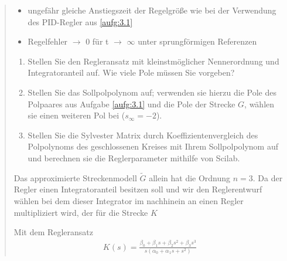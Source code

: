 \begin{quote}
\begin{itemize}
            \item ungefähr gleiche Anstiegszeit der Regelgröße wie bei der Verwendung des PID-Regler aus
            \ref{aufg:3.1}
            
            \item Regelfehler $\to$ 0 für t $\to$ $\infty$ unter sprungförmigen Referenzen
        
        \end{itemize}
        \vspace{1em}
        
        \begin{enumerate}
            
            \item Stellen Sie den Regleransatz mit kleinstmöglicher Nennerordnung und Integratoranteil auf. Wie viele Pole
            müssen Sie vorgeben?\\
            
            \item Stellen Sie das Sollpolpolynom auf; verwenden sie hierzu die Pole des Polpaares aus Aufgabe \ref{aufg:3.1}
            und die Pole der Strecke $G$, wählen sie einen weiteren Pol bei ($s_\infty = -2$).\\
            
            \item Stellen Sie die Sylvester Matrix durch Koeffizientenvergleich des Polpolynoms des geschlossenen Kreises
            mit Ihrem Sollpolpolynom auf und berechnen sie die Reglerparameter mithilfe von Scilab.\\
        
        \end{enumerate}\vspace{1em}
        
        Das approximierte Streckenmodell $\tilde{G}$ allein hat die Ordnung $n = 3$. Da der Regler einen
        Integratoranteil besitzen soll und wir den Reglerentwurf wählen bei dem dieser Integrator im nachhinein
        an einen Regler multipliziert wird, der für die Strecke $K $ 
        
        
        
        Mit dem Regleransatz\\
        
        \begin{equation*}
            \begin{split}
                K(s) = \frac{\beta_0 + \beta_1 s + \beta_2 s^2 + \beta_3 s^3}{s(\alpha_0 + \alpha_1 s + s^2)}
            \end{split}
        \end{equation*}\vspace{1em}
        

\end{quote}
